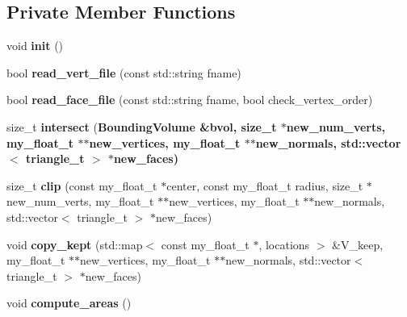 \subsection*{Private Member Functions}
\begin{CompactItemize}
\item 
void \textbf{init} ()\label{classSimSite3D_1_1SimpleTrimesh_0e5578ec2f86102a488219ec4765636c}

\item 
bool \textbf{read\_\-vert\_\-file} (const std::string fname)\label{classSimSite3D_1_1SimpleTrimesh_817b22c2555bee30b2c3a08669e3ba46}

\item 
bool \textbf{read\_\-face\_\-file} (const std::string fname, bool check\_\-vertex\_\-order)\label{classSimSite3D_1_1SimpleTrimesh_45339d3843bd2b4c17ad571eb3622a9c}

\item 
size\_\-t \textbf{intersect} (\bf{Bounding\-Volume} \&bvol, size\_\-t $\ast$new\_\-num\_\-verts, my\_\-float\_\-t $\ast$$\ast$new\_\-vertices, my\_\-float\_\-t $\ast$$\ast$new\_\-normals, std::vector$<$ triangle\_\-t $>$ $\ast$new\_\-faces)\label{classSimSite3D_1_1SimpleTrimesh_e63a3ebc10e0983b60504e799992d7c6}

\item 
size\_\-t \textbf{clip} (const my\_\-float\_\-t $\ast$center, const my\_\-float\_\-t radius, size\_\-t $\ast$new\_\-num\_\-verts, my\_\-float\_\-t $\ast$$\ast$new\_\-vertices, my\_\-float\_\-t $\ast$$\ast$new\_\-normals, std::vector$<$ triangle\_\-t $>$ $\ast$new\_\-faces)\label{classSimSite3D_1_1SimpleTrimesh_8dc60bdfb5cd7102b5fe52ed0a2afb31}

\item 
void \textbf{copy\_\-kept} (std::map$<$ const my\_\-float\_\-t $\ast$, locations $>$ \&V\_\-keep, my\_\-float\_\-t $\ast$$\ast$new\_\-vertices, my\_\-float\_\-t $\ast$$\ast$new\_\-normals, std::vector$<$ triangle\_\-t $>$ $\ast$new\_\-faces)\label{classSimSite3D_1_1SimpleTrimesh_a584badfab426f5b183a103b4082186b}

\item 
void \textbf{compute\_\-areas} ()\label{classSimSite3D_1_1SimpleTrimesh_7ae5091189436be2401d74ada2f49349}

\end{CompactItemize}
